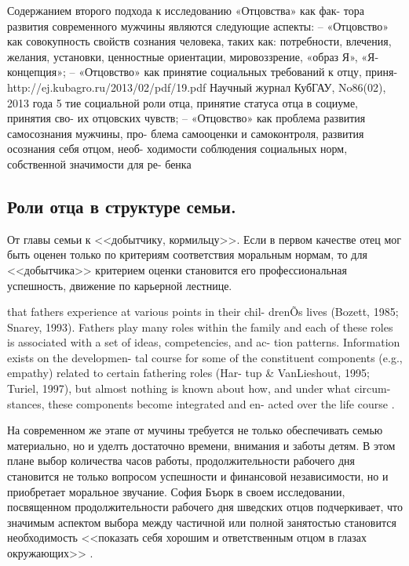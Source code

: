 \documentclass{../../common/thesisbyxetex}
\begin{document}
Содержанием второго подхода к исследованию «Отцовства» как фак-
тора развития современного мужчины являются следующие аспекты:
– «Отцовство» как совокупность свойств сознания человека, таких
как: потребности, влечения, желания, установки, ценностные ориентации,
мировоззрение, «образ Я», «Я-концепция»;
– «Отцовство» как принятие социальных требований к отцу, приня-
http://ej.kubagro.ru/2013/02/pdf/19.pdf
Научный журнал КубГАУ, No86(02), 2013 года
 5
тие социальной роли отца, принятие статуса отца в социуме, принятия сво-
их отцовских чувств;
– «Отцовство» как проблема развития самосознания мужчины, про-
блема самооценки и самоконтроля, развития осознания себя отцом, необ-
ходимости соблюдения социальных норм, собственной значимости для ре-
бенка \cite{psyot}



\subsection{Роли отца в структуре семьи.}



От главы семьи к <<добытчику, кормильцу>>. Если в первом качестве отец мог быть оценен только по
критериям
соответствия моральным нормам, то для <<добытчика>> критерием оценки становится его 
профессиональная успешность, движение по карьерной лестнице. 

that fathers experience at various points in their chil-
drenÕs lives (Bozett, 1985; Snarey, 1993). Fathers play
many roles within the family and each of these roles is
associated with a set of ideas, competencies, and ac-
tion patterns. Information exists on the developmen-
tal course for some of the constituent components
(e.g., empathy) related to certain fathering roles (Har-
tup \& VanLieshout, 1995; Turiel, 1997), but almost
nothing is known about how, and under what circum-
stances, these components become integrated and en-
acted over the life course \cite[131]{f21}.


На современном же этапе от мучины требуется не только обеспечивать семью материально, но и уделть 
достаточно времени, внимания и заботы детям. В этом плане выбор количества часов работы, 
продолжительности рабочего дня становится не только вопросом успешности и финансовой независимости, 
но и приобретает моральное звучание. София Бъорк в своем исследовании, посвященном  
продолжительности рабочего дня шведских отцов подчеркивает, что значимым аспектом  выбора 
между частичной или полной занятостью становится необходимость <<показать себя хорошим и 
ответственным отцом в глазах окружающих>> \cite[221]{morfat}.
\end{document}
